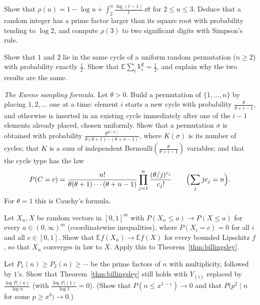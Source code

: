 \begin{exercise}[$\star$]\label{ex:rho3}
Show that $\rho(u)=1-\log u+\int_2^u\frac{\log(t-1)}t\,\dd t$ for $2\le u\le3$. Deduce that a random integer has a prime factor larger than its square root with probability tending to $\log2$, and compute $\rho(3)$ to two significant digits with Simpson's rule.
\end{exercise}

\begin{exercise}[$\star$]\label{ex:samecycle}
Show that $1$ and $2$ lie in the same cycle of a uniform random permutation ($n\ge2$) with probability exactly $\frac12$. Show that $\mathbb E\sum_iV_i^2=\frac12$, and explain why the two results are the same.
\end{exercise}

\begin{exercise}[$\star\star$]\label{ex:ewens}
\emph{The Ewens sampling formula.} Let $\theta>0$. Build a permutation of $\{1,\dots,n\}$ by placing $1,2,\dots$ one at a time: element $i$ starts a new cycle with probability $\frac\theta{\theta+i-1}$, and otherwise is inserted in an existing cycle immediately after one of
the $i-1$ elements already placed, chosen uniformly. Show that a permutation $\sigma$ is obtained with probability $\frac{\theta^{K(\sigma)}}{\theta(\theta+1)\cdots(\theta+n-1)}$, where $K(\sigma)$ is its number of cycles; that $K$ is a sum of independent Bernoulli$(\frac\theta{\theta+i-1})$ variables; and that the
cycle type has the law
\[
P(C=c)=\frac{n!}{\theta(\theta+1)\cdots(\theta+n-1)}\prod_{j=1}^n\frac{(\theta/j)^{c_j}}{c_j!}\qquad\Bigl(\sum_jjc_j=n\Bigr).
\]
For $\theta=1$ this is Cauchy's formula.
\end{exercise}

\begin{exercise}[$\star\star$]\label{ex:cdflaw}
Let $X_n,X$ be random vectors in $[0,1]^m$ with $P(X_n\le a)\to P(X\le a)$ for every $a\in(0,\infty)^m$ (coordinatewise inequalities), where $P(X_i=c)=0$ for all $i$ and all $c\in[0,1]$. Show that $\mathbb Ef(X_n)\to\mathbb Ef(X)$ for every bounded Lipschitz $f$, so that $X_n$ converges in law to $X$.
Apply this to Theorem~\ref{thm:billingsley}.
\end{exercise}

\begin{exercise}[$\star\star$]\label{ex:multiplicity}
Let $P_1(n)\ge P_2(n)\ge\cdots$ be the prime factors of $n$ with multiplicity, followed by $1$'s. Show that Theorem~\ref{thm:billingsley} still holds with $Y_{(i)}$ replaced by $\frac{\log P_i(n)}{\log n}$ (with $\frac{\log P_i(1)}{\log1}=0$). (Show that $P(n\le x^{1-\varepsilon})\to0$ and that
$P(p^2\mid n$ for some $p\ge x^\delta)\to0$.)
\end{exercise}

